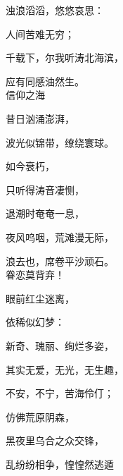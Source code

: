 {浊浪滔滔，悠悠哀思：

人间苦难无穷；

千载下，尔我听涛北海滨，

应有同感油然生。\\




信仰之海

昔日汹涌澎湃，

波光似锦带，缭绕寰球。

如今衰朽，

只听得涛音凄恻，

退潮时奄奄一息，

夜风呜咽，荒滩漫无际，

浪去也，席卷平沙顽石。\\



眷恋莫背弃！

眼前红尘迷离，

依稀似幻梦：

新奇、瑰丽、绚烂多姿，

其实无爱，无光，无生趣，

不安，不宁，苦海伶仃；

仿佛荒原阴森，

黑夜里乌合之众交锋，

乱纷纷相争，惶惶然逃遁}